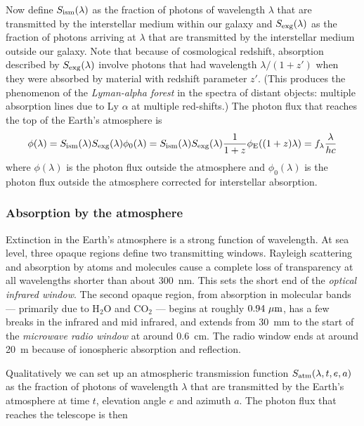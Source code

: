 \documentclass{article}
\begin{document}
Now define $S_{\rm
  ism}(\lambda)$ as the fraction of photons of wavelength $\lambda$
that are transmitted by the interstellar medium within our galaxy and
$S_{\rm exg}(\lambda)$ as the fraction of photons arriving at
$\lambda$ that are transmitted by the interstellar medium outside our
galaxy. Note that because of cosmological redshift, absorption
described by $S_{\rm exg}(\lambda)$ involve photons that had
wavelength ${\lambda/(1+z')}$ when they were absorbed by material with
  redshift parameter $z'$. (This produces the phenomenon of the {\it
    Lyman-alpha forest} in the spectra of distant objects: multiple
  absorption lines due to Ly $\alpha$ at multiple red-shifts.) The
  photon flux that reaches the top of the Earth's atmosphere is 
\[
\phi(\lambda)=S_{\rm ism}(\lambda) S_{\rm
  exg}(\lambda)\phi_0(\lambda)=S_{\rm ism}(\lambda) S_{\rm
  exg}(\lambda)\frac{1}{1+z}\phi_{\rm E}((1+z)\lambda)=f_\lambda\frac{\lambda}{hc}
\]
where $\phi(\lambda)$ is the photon flux outside the atmosphere and
$\phi_0(\lambda)$ is the photon flux outside the atmosphere corrected
for interstellar absorption. 
\subsubsection{Absorption by the atmosphere}
Extinction in the Earth's atmosphere is a strong function of
wavelength. At sea level, three opaque regions define two transmitting
windows. Rayleigh scattering and absorption by atoms and molecules
cause a complete loss of transparency at all wavelengths shorter than
about 300~nm. This sets the short end of the {\it optical infrared
  window}. The second opaque region, from absorption in molecular
bands --- primarily due to H$_2$O and CO$_2$ --- begins at roughly
$0.94~\mu{\rm m}$, has a few breaks in the infrared and mid infrared,
and extends from 30~mm to the start of the {\it microwave radio
  window} at around 0.6~cm. The radio window ends at around 20~m
because of ionospheric absorption and reflection.

Qualitatively we can set up an atmospheric transmission function
$S_{\rm atm}(\lambda,t,e,a)$ as the fraction of photons of wavelength
$\lambda$ that are transmitted by the Earth's atmosphere at time $t$,
elevation angle $e$ and azimuth $a$. The photon flux that reaches the
telescope is then
\end{document}

